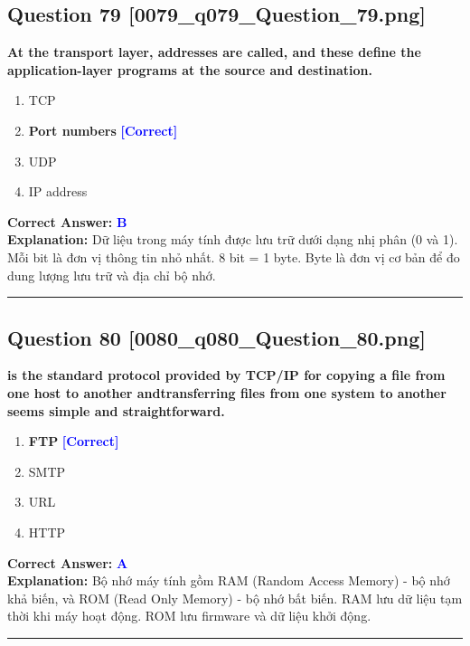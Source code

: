 \documentclass[11pt,a4paper]{article}
\begin{document}
\begin{minipage}{\textwidth}
\subsection*{Question 79 \quad \footnotesize{[0079\_q079\_Question\_79.png]}}
\noindent \textbf{At the transport layer, addresses are called, and these define the application-layer programs at the source and destination.}

\begin{enumerate}[label=\Alph*.]
    \item TCP
    \item \textbf{Port numbers} \hfill \textcolor{blue}{\textbf{[Correct]}}
    \item UDP
    \item IP address
\end{enumerate}

\noindent \textbf{Correct Answer:} \textcolor{blue}{\textbf{B}} \\[2pt]
\noindent \textbf{Explanation:} Dữ liệu trong máy tính được lưu trữ dưới dạng nhị phân (0 và 1). Mỗi bit là đơn vị thông tin nhỏ nhất. 8 bit = 1 byte. Byte là đơn vị cơ bản để đo dung lượng lưu trữ và địa chỉ bộ nhớ.

\par\vspace{0.3cm}
\hrule
\vspace{0.3cm}
\end{minipage}

\begin{minipage}{\textwidth}
\subsection*{Question 80 \quad \footnotesize{[0080\_q080\_Question\_80.png]}}
\noindent \textbf{is the standard protocol provided by TCP/IP for copying a file from one host to another andtransferring files from one system to another seems simple and straightforward.}

\begin{enumerate}[label=\Alph*.]
    \item \textbf{FTP} \hfill \textcolor{blue}{\textbf{[Correct]}}
    \item SMTP
    \item URL
    \item HTTP
\end{enumerate}

\noindent \textbf{Correct Answer:} \textcolor{blue}{\textbf{A}} \\[2pt]
\noindent \textbf{Explanation:} Bộ nhớ máy tính gồm RAM (Random Access Memory) - bộ nhớ khả biến, và ROM (Read Only Memory) - bộ nhớ bất biến. RAM lưu dữ liệu tạm thời khi máy hoạt động. ROM lưu firmware và dữ liệu khởi động.

\par\vspace{0.3cm}
\hrule
\vspace{0.3cm}
\end{minipage}
\end{document}
